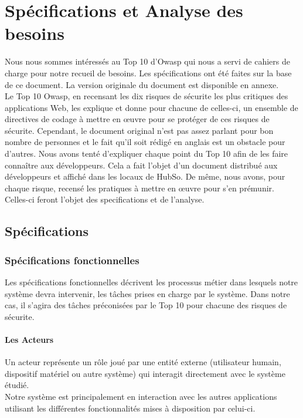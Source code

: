 \chapter{Spécifications et Analyse des besoins}
Nous nous sommes intéressés au Top 10 d'Owasp qui nous a servi de cahiers de charge pour notre recueil de besoins. Les spécifications ont été faites sur la base de ce document. La version originale du document est disponible en annexe.\\
Le Top 10 Owasp, en recensant les dix risques de sécurite les plus critiques des applications Web, les explique et donne pour chacune de celles-ci, un ensemble de directives de codage à mettre en œuvre pour se protéger de ces risques de sécurite. Cependant, le document original n'est pas assez parlant pour bon nombre de personnes et le fait qu'il soit rédigé en anglais est un obstacle pour d'autres. Nous avons tenté d'expliquer chaque point du Top 10 afin de les faire connaître aux développeurs. Cela a fait l'objet d'un document distribué aux développeurs et affiché dans les locaux de HubSo. De même, nous avons, pour chaque risque, recensé les pratiques à mettre en œuvre pour s'en prémunir. Celles-ci feront l'objet des specifications et de l'analyse.

\section{Spécifications}

\subsection{Spécifications fonctionnelles}
Les spécifications fonctionnelles décrivent les processus métier dans lesquels notre système devra intervenir, les tâches prises en charge par le système. Dans notre cas, il s'agira des tâches préconisées par le Top 10 pour chacune des risques de sécurite. 

\subsubsection{Les Acteurs}
Un acteur représente un rôle joué par une entité externe (utilisateur humain, dispositif matériel
ou autre système) qui interagit directement avec le système étudié.\\
Notre système est principalement en interaction avec les autres applications utilisant les différentes fonctionnalités mises à disposition par celui-ci. 

